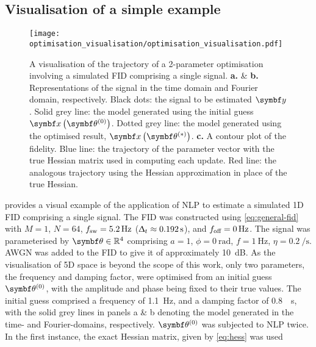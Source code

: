\subsection{Visualisation of a simple example}
\label{subsec:optim-vis}
\begin{figure}
    \centering
    \texttt{[image: optimisation\_visualisation/optimisation\_visualisation.pdf]}
    \caption[
        A visualisation of the trajectory of a 2-parameter optimisation
        involving a simulated \acs{FID} comprising a single signal.
    ]
    {
        A visualisation of the trajectory of a 2-parameter optimisation
        involving a simulated \acs{FID} comprising a single signal.
        \textbf{a.} \& \textbf{b.} Representations of the signal in
        the time domain and Fourier domain, respectively.
        Black dots: the signal to be estimated $\by$.
        Solid grey line: the model generated
        using the initial guess $\bx \left( \bthzero \right)$.
        Dotted grey line: the model generated using the optimised result, $\bx
        \left( \bthstar \right)$.
        \textbf{c.} A contour plot of the fidelity.
        Blue line: the trajectory of the parameter vector with the true
        Hessian matrix used in computing each update.
        Red line: the analogous trajectory using the Hessian approximation
        in place of the true Hessian.
    }
    \label{fig:optim-vis}
\end{figure}
 provides a visual example of the application of \ac{NLP}
to estimate a simulated \ac{1D} \ac{FID} comprising a single signal.
The FID was constructed using \cref{eq:general-fid} with $M=1$,
$N = 64$, $f_{\mathrm{sw}} = \qty{5.2}{\hertz}$ ($\Updelta_t \approx
\qty{0.192}{\second}$), and $f_{\text{off}} = \qty{0}{\hertz}$.
The signal was parameterised by $\bth \in \mathbb{R}^4$ comprising $a=1$,
$\phi=\qty{0}{\radian}$, $f=\qty{1}{\hertz}$, $\eta=\qty{0.2}{\per\second}$.
\ac{AWGN} was added to the \ac{FID} to give it  of approximately
\qty{10}{\deci\bel}. As the visualisation of 5D space is beyond the scope of
this work, only two parameters, the frequency and damping factor, were optimised
from an initial guess $\bthzero$, with the amplitude and phase being fixed to
their true values. The initial guess comprised a frequency of
\qty{1.1}{\hertz}, and a damping factor of \qty{0.8}{\per\second}, with the
solid grey lines in panels a \& b denoting the model generated in the time- and
Fourier-domains, respectively. $\bthzero$ was subjected to \ac{NLP} twice. In
the first instance, the exact Hessian matrix, given by \cref{eq:hess} was used
